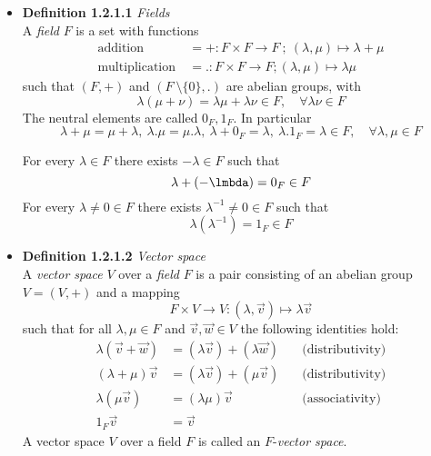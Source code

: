 \documentclass[11pt,a4paper]{article}
\begin{document}
\begin{itemize}

    \item \textbf{Definition 1.2.1.1} \emph{Fields} \\
        A \emph{field} $F$ is a set with functions
        \begin{align*}{}
            \text{addition} \  &= + : F \times F \to F \ ;
            \ (\lambda, \mu) \mapsto \lambda + \mu \\
            \text{multiplication} \ &=. : F \times F \to F ; (\lambda, \mu)
            \mapsto \lambda\mu
        \end{align*}
        such that $(F, +)$ and $(F \ \setminus \{0\},.)$ are abelian groups, with
        \[
            \lambda (\mu + \nu) = \lambda \mu + \lambda \nu \in F, \quad
            \forall \lambda \nu \in F
        \]
        The neutral elements are called $0_F, 1_F$.
        In particular
        \[
            \lambda + \mu = \mu + \lambda ,\
            \lambda. \mu  = \mu. \lambda ,\
            \lambda + 0_F = \lambda ,\
            \lambda. 1_F  = \lambda \in F, \quad
            \forall \lambda, \mu \in F
        \]

        For every $\lambda \in F$ there exists $-\lambda \in F$ such that
        \[
            \lambda + (-\lmbda) = 0_F \in F
        \]
        For every $\lambda \neq 0 \in F$ there exists $\lambda^{-1} \neq 0 \in F$ such that
        \[
            \lambda(\lambda^{-1}) = 1_F \in F
        \]

    \item \textbf{Definition 1.2.1.2} \emph{Vector space} \\
        A \emph{vector space} $V$ over a \emph{field} $F$
        is a pair consisting of an abelian group $V = (V,+)$ and a mapping
        \[
            F \times V \to V : (\lambda, \vec{v}) \mapsto \lambda \vec{v}
        \]
        such that for all $\lambda, \mu \in F$ and $\vec{v}, \vec{w} \in V$
        the following identities hold:
        \begin{align*}{}
            \lambda(\vec{v} + \vec{w}) & = (\lambda \vec{v}) + (\lambda \vec{w})
            \quad                            & \text{(distributivity)} \\
            (\lambda + \mu) \vec{v}       & = (\lambda \vec{v}) + (\mu \vec{v})
            \quad                            & \text{(distributivity)} \\
            \lambda(\mu \vec{v})          & = (\lambda \mu) \vec{v}
            \quad                            & \text{(associativity)} \\
            1_F\vec{v}                    & = \vec{v}
        \end{align*}
        A vector space $V$ over a field $F$ is called an $F$-\emph{vector space}.


\end{itemize}
\end{document}
